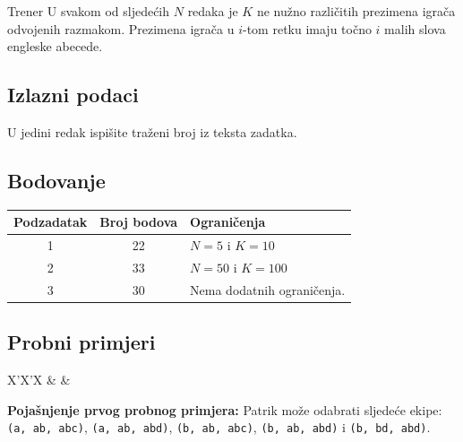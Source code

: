 \begin{statement}[
  problempoints=110,
  timelimit=2 sekunde,
  memorylimit=512 MiB,
]{Trener}
U svakom od sljedećih $N$ redaka je $K$ ne nužno različitih prezimena igrača
odvojenih razmakom. Prezimena igrača u $i$-tom retku imaju točno $i$ malih slova
engleske abecede.

\subsection*{Izlazni podaci}
U jedini redak ispišite traženi broj iz teksta zadatka.

\subsection*{Bodovanje}
{\renewcommand{\arraystretch}{1.4}
  \setlength{\tabcolsep}{6pt}
  \begin{tabular}{ccl}
 Podzadatak & Broj bodova & Ograničenja \\ \midrule
  1 & 22 & $N = 5$ i $K = 10$ \\
  2 & 33 & $N = 50$ i $K = 100$\\
  3 & 30 & Nema dodatnih ograničenja. \\
\end{tabular}}

\subsection*{Probni primjeri}
\begin{tabularx}{\textwidth}{X'X'X}
 &
 &
\end{tabularx}

\textbf{Pojašnjenje prvog probnog primjera:}
Patrik može odabrati sljedeće ekipe: \texttt{(a, ab, abc)}, \texttt{(a, ab, abd)},
\texttt{(b, ab, abc)}, \texttt{(b, ab, abd)} i \texttt{(b, bd, abd)}.

\end{statement}

